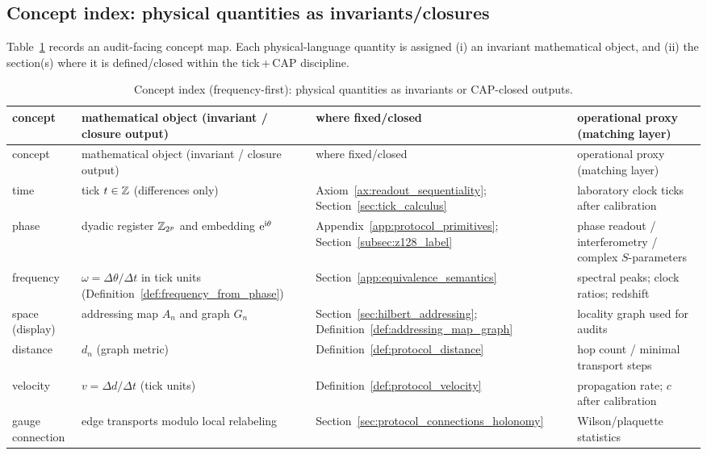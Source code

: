 \subsection{Concept index: physical quantities as invariants/closures}
\label{subsec:concept_index}

Table~\ref{tab:concept_index} records an audit-facing concept map.
Each physical-language quantity is assigned (i) an invariant mathematical object, and (ii) the section(s) where it is defined/closed within the tick\,+\,CAP discipline.

\begin{longtable}{p{} p{} p{} p{}}
\caption{Concept index (frequency-first): physical quantities as invariants or CAP-closed outputs.}
\label{tab:concept_index}\\
\toprule
concept & mathematical object (invariant / closure output) & where fixed/closed & operational proxy (matching layer) \\
\midrule
\endfirsthead
\toprule
concept & mathematical object (invariant / closure output) & where fixed/closed & operational proxy (matching layer) \\
\midrule
\endhead
time & tick $t\in\mathbb{Z}$ (differences only) & Axiom~\ref{ax:readout_sequentiality}; Section~\ref{sec:tick_calculus} & laboratory clock ticks after calibration \\
phase & dyadic register $\mathbb{Z}_{2^p}$ and embedding $\mathrm{e}^{\mathrm{i}\theta}$ & Appendix~\ref{app:protocol_primitives}; Section~\ref{subsec:z128_label} & phase readout / interferometry / complex $S$-parameters \\
frequency & $\omega=\Delta\theta/\Delta t$ in tick units (Definition~\ref{def:frequency_from_phase}) & Section~\ref{app:equivalence_semantics} & spectral peaks; clock ratios; redshift \\
space (display) & addressing map $A_n$ and graph $G_n$ & Section~\ref{sec:hilbert_addressing}; Definition~\ref{def:addressing_map_graph} & locality graph used for audits \\
distance & $d_n$ (graph metric) & Definition~\ref{def:protocol_distance} & hop count / minimal transport steps \\
velocity & $v=\Delta d/\Delta t$ (tick units) & Definition~\ref{def:protocol_velocity} & propagation rate; $c$ after calibration \\
gauge connection & edge transports modulo local relabeling & Section~\ref{sec:protocol_connections_holonomy} & Wilson/plaquette statistics \\

\end{longtable}
